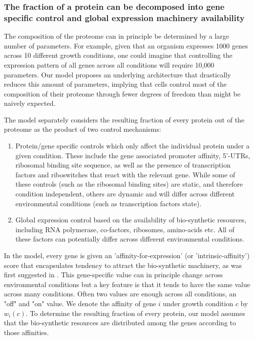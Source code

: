 \subsubsection{The fraction of a protein can be decomposed into gene specific control and global
expression machinery availability}
The composition of the proteome can in principle be determined by a large number of parameters.
For example, given that an organism expresses 1000 genes across 10 different growth conditions, one could imagine that controlling the expression pattern of all genes across all conditions will require 10,000 parameters.
Our model proposes an underlying architecture that drastically reduces this amount of parameters, implying that cells control most of the composition of their proteome through fewer degrees of freedom than might be naively expected.

The model separately considers the resulting fraction of every protein out of the proteome as the product of two control mechanisms:
\begin{enumerate}
\item Protein/gene specific controls which only affect the individual protein under a given condition. These include the gene associated promoter affinity, 5'-UTRs, ribosomal binding site sequence, as well as the presence of transcription factors and riboswitches that react with the relevant gene.
  While some of these controls (such as the ribosomal binding sites) are static, and therefore condition independent, others are dynamic and will differ across different environmental conditions (such as transcription factors state).
\item Global expression control based on the availability of bio-synthetic resources, including RNA polymerase, co-factors, ribosomes, amino-acids etc.
  All of these factors can potentially differ across different environmental conditions.
\end{enumerate}

In the model, every gene is given an 'affinity-for-expression' (or 'intrinsic-affinity') score that encapsulates tendency to attract the bio-synthetic machinery, as was first suggested in \cite{Maaloe1969}.
This gene-specific value can in principle change across environmental conditions but a key feature is that it tends to have the same value across many conditions.
Often two values are enough across all conditions, an "off" and "on" value.
We denote the affinity of gene $i$ under growth condition $c$ by $w_i(c)$.
To determine the resulting fraction of every protein, our model assumes that the bio-synthetic resources are distributed among the genes according to those affinities.

